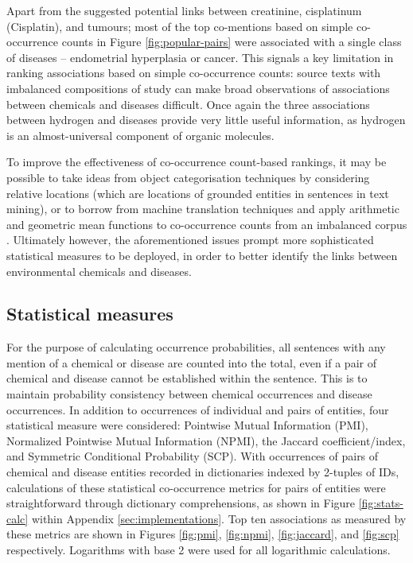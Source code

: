 \documentclass[10pt, oneside]{article}
\begin{document}
Apart from the suggested potential links between creatinine, cisplatinum (Cisplatin), and tumours; most of the top co-mentions based on simple co-occurrence counts in Figure \ref{fig:popular-pairs} were associated with a single class of diseases -- endometrial hyperplasia or cancer. This signals a key limitation in ranking associations based on simple co-occurrence counts: source texts with imbalanced compositions of study can make broad observations of associations between chemicals and diseases difficult. Once again the three associations between hydrogen and diseases provide very little useful information, as hydrogen is an almost-universal component of organic molecules. 

To improve the effectiveness of co-occurrence count-based rankings, it may be possible to take ideas from object categorisation techniques by considering relative locations (which are locations of grounded entities in sentences in text mining)\cite{galleguillos2008object}, or to borrow from machine translation techniques and apply arithmetic and geometric mean functions to co-occurrence counts from an imbalanced corpus \cite{zhu2014improving}. Ultimately however, the aforementioned issues prompt more sophisticated statistical measures to be deployed, in order to better identify the links between environmental chemicals and diseases.

\subsection{Statistical measures}

For the purpose of calculating occurrence probabilities, all sentences with any mention of a chemical or disease are counted into the total, even if a pair of chemical and disease cannot be established within the sentence. This is to maintain probability consistency between chemical occurrences and disease occurrences. In addition to occurrences of individual and pairs of entities, four statistical measure were considered: Pointwise Mutual Information (PMI), Normalized Pointwise Mutual Information (NPMI), the Jaccard coefficient/index, and Symmetric Conditional Probability (SCP). With occurrences of pairs of chemical and disease entities recorded in dictionaries indexed by 2-tuples of IDs, calculations of these statistical co-occurrence metrics for pairs of entities were straightforward through dictionary comprehensions, as shown in Figure \ref{fig:stats-calc} within Appendix \ref{sec:implementations}. Top ten associations as measured by these metrics are shown in Figures \ref{fig:pmi}, \ref{fig:npmi}, \ref{fig:jaccard}, and \ref{fig:scp} respectively. Logarithms with base 2 were used for all logarithmic calculations.
\end{document}
